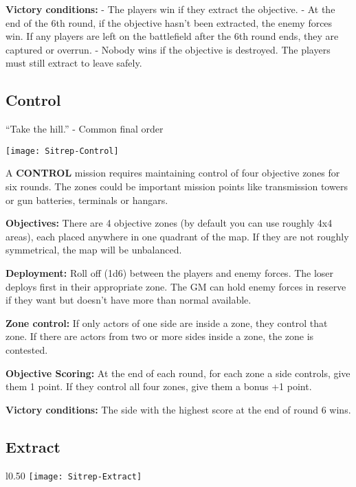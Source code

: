  \textbf{Victory conditions:} 
 - The players win if they extract the objective.
 - At the end of the 6th round, if the objective hasn’t been extracted, the enemy forces win. If any players are left on the battlefield after the 6th round ends, they are captured or overrun.
 - Nobody wins if the objective is destroyed. The players must still extract to leave safely.
 \newpage         
 \subsection{Control}

 “Take the hill.” - Common final order

 \begin{center}
   \texttt{[image: Sitrep-Control]}
 \end{center}        

 A \textbf{CONTROL} mission requires maintaining control of four objective zones for six rounds. The zones could be important mission points like transmission towers or gun batteries, terminals or hangars.

 \textbf{Objectives:} There are 4 objective zones (by default you can use roughly 4x4 areas), each placed anywhere in one quadrant of the map. If they are not roughly symmetrical, the map will be unbalanced.

 \textbf{Deployment:} Roll off (1d6) between the players and enemy forces. The loser deploys first in their appropriate zone. The GM can hold enemy forces in reserve if they want but doesn’t have more than normal available.

 \textbf{Zone control:} If only actors of one side are inside a zone, they control that zone. If there are actors from two or more sides inside a zone, the zone is contested.

 \textbf{Objective Scoring:} At the end of each round, for each zone a side controls, give them 1 point. If they control all four zones, give them a bonus +1 point.
 
 \textbf{Victory conditions:} The side with the highest score at the end of round 6 wins.
 
 \newpage
 \subsection{Extract}

 \begin{wrapfigure}{l}{0.50\textwidth}
   \centering
   \texttt{[image: Sitrep-Extract]}
 \end{wrapfigure}

